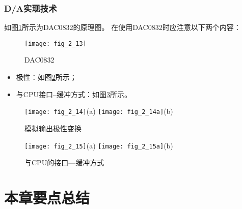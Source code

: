 \subsubsection{D/A实现技术}


如图\ref{fig_2_13}所示为DAC0832的原理图。
在使用DAC0832时应注意以下两个内容：

\begin{figure}
  \centering
  \texttt{[image: fig\_2\_13]}
  \caption{DAC0832}\label{fig_2_13}
\end{figure}


\begin{itemize}
  \item 极性：如图\ref{fig_2_14}所示；
  \item 与CPU接口--缓冲方式：如图\ref{fig_2_15}所示。
\end{itemize}

\begin{figure}
  \centering
  \texttt{[image: fig\_2\_14]}(a)
  \texttt{[image: fig\_2\_14a]}(b)
  \caption{模拟输出极性变换}\label{fig_2_14}
\end{figure}


\begin{figure}
  \centering
  \texttt{[image: fig\_2\_15]}(a)
  \texttt{[image: fig\_2\_15a]}(b)
  \caption{与CPU的接口---缓冲方式}\label{fig_2_15}
\end{figure}






\section{本章要点总结}

